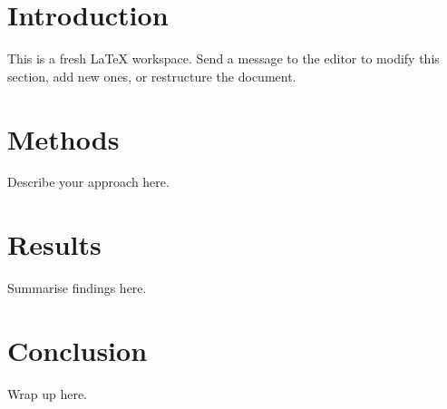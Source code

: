 \documentclass{article}
\begin{document}
\section{Introduction}
This is a fresh LaTeX workspace. Send a message to the editor to
modify this section, add new ones, or restructure the document.

\section{Methods}
Describe your approach here.

\section{Results}
Summarise findings here.

\section{Conclusion}
Wrap up here.
\end{document}
